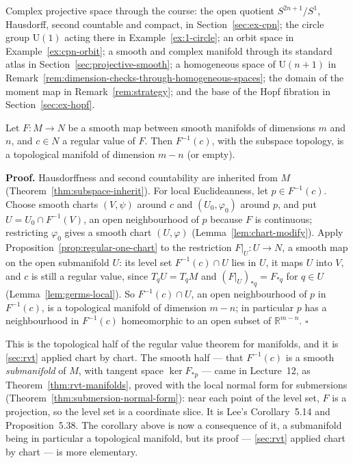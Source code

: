 \documentclass[11pt]{report}
\makeatletter
\newcounter{thmcounter}[section]
\renewenvironment{proof}[1][Proof]{\noindent\textbf{#1.} }{\hfill$\square$\par\vspace{5pt}}
\newcommand{\thmlabel}[1]{\edef\@currentlabel{\arabic{section}.\arabic{thmcounter}}\label{#1}}
\newcommand{\Ugp}{\mathrm{U}}
\makeatother
\begin{document}
Complex projective space through the course: the open quotient $S^{2n+1}/S^1$, Hausdorff, second countable and compact, in Section~\ref{sec:ex-cpn}; the circle group $\Ugp(1)$ acting there in Example~\ref{ex:1-circle}; an orbit space in Example~\ref{ex:cpn-orbit}; a smooth and complex manifold through its standard atlas in Section~\ref{sec:projective-smooth}; a homogeneous space of $\Ugp(n+1)$ in Remark~\ref{rem:dimension-checks-through-homogeneous-spaces}; the domain of the moment map in Remark~\ref{rem:strategy}; and the base of the Hopf fibration in Section~\ref{sec:ex-hopf}.


\begin{corbox}\thmlabel{cor:manifold-level-sets}
Let $F : M \to N$ be a smooth map between smooth manifolds of dimensions $m$ and $n$, and $c \in N$ a regular value of $F$. Then $F^{-1}(c)$, with the subspace topology, is a topological manifold of dimension $m - n$ (or empty).
\end{corbox}

\begin{proof}
Hausdorffness and second countability are inherited from $M$ (Theorem~\ref{thm:subspace-inherit}). For local Euclideanness, let $p \in F^{-1}(c)$. Choose smooth charts $(V, \psi)$ around $c$ and $(U_0, \varphi_0)$ around $p$, and put $U = U_0 \cap F^{-1}(V)$, an open neighbourhood of $p$ because $F$ is continuous; restricting $\varphi_0$ gives a smooth chart $(U, \varphi)$ (Lemma~\ref{lem:chart-modify}). Apply Proposition~\ref{prop:regular-one-chart} to the restriction $F|_U : U \to N$, a smooth map on the open submanifold $U$: its level set $F^{-1}(c) \cap U$ lies in $U$, it maps $U$ into $V$, and $c$ is still a regular value, since $T_qU = T_qM$ and $(F|_U)_{*q} = F_{*q}$ for $q \in U$ (Lemma~\ref{lem:germs-local}). So $F^{-1}(c) \cap U$, an open neighbourhood of $p$ in $F^{-1}(c)$, is a topological manifold of dimension $m - n$; in particular $p$ has a neighbourhood in $F^{-1}(c)$ homeomorphic to an open subset of $\mathbb{R}^{m-n}$.
\end{proof}

This is the topological half of the regular value theorem for manifolds, and it is \ref{sec:rvt} applied chart by chart. The smooth half --- that $F^{-1}(c)$ is a smooth \emph{submanifold} of $M$, with tangent space $\ker F_{*p}$ --- came in Lecture~12, as Theorem~\ref{thm:rvt-manifolds}, proved with the local normal form for submersions (Theorem~\ref{thm:submersion-normal-form}): near each point of the level set, $F$ is a projection, so the level set is a coordinate slice. It is Lee's Corollary~5.14 and Proposition~5.38. The corollary above is now a consequence of it, a submanifold being in particular a topological manifold, but its proof --- \ref{sec:rvt} applied chart by chart --- is more elementary.
\end{document}
